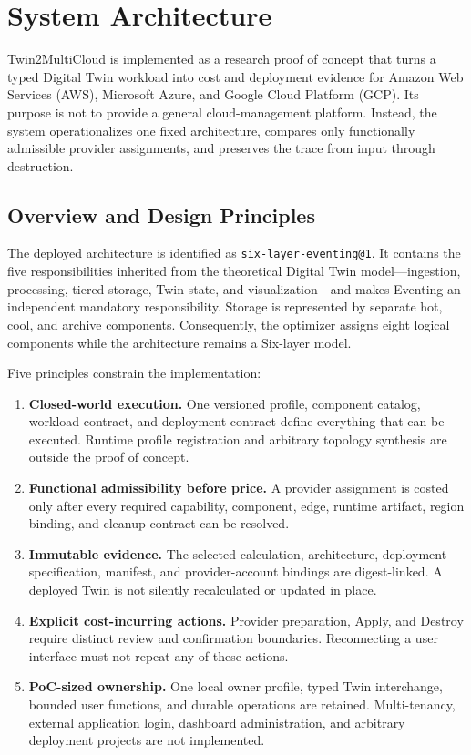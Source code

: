 \chapter{\label{chap:systemArchitecture}System Architecture}

Twin2MultiCloud is implemented as a research proof of concept that turns a
typed Digital Twin workload into cost and deployment evidence for Amazon Web
Services (AWS), Microsoft Azure, and Google Cloud Platform (GCP). Its purpose
is not to provide a general cloud-management platform. Instead, the system
operationalizes one fixed architecture, compares only functionally admissible
provider assignments, and preserves the trace from input through destruction.

\section{Overview and Design Principles}
\label{sec:arch-overview}

The deployed architecture is identified as
\texttt{six-layer-eventing@1}. It contains the five responsibilities inherited
from the theoretical Digital Twin model---ingestion, processing, tiered
storage, Twin state, and visualization---and makes Eventing an independent
mandatory responsibility. Storage is represented by separate hot, cool, and
archive components. Consequently, the optimizer assigns eight logical
components while the architecture remains a Six-layer model.

Five principles constrain the implementation:

\begin{enumerate}
    \item \textbf{Closed-world execution.} One versioned profile, component
    catalog, workload contract, and deployment contract define everything that
    can be executed. Runtime profile registration and arbitrary topology
    synthesis are outside the proof of concept.
    \item \textbf{Functional admissibility before price.} A provider
    assignment is costed only after every required capability, component,
    edge, runtime artifact, region binding, and cleanup contract can be
    resolved.
    \item \textbf{Immutable evidence.} The selected calculation, architecture,
    deployment specification, manifest, and provider-account bindings are
    digest-linked. A deployed Twin is not silently recalculated or updated in
    place.
    \item \textbf{Explicit cost-incurring actions.} Provider preparation,
    Apply, and Destroy require distinct review and confirmation boundaries.
    Reconnecting a user interface must not repeat any of these actions.
    \item \textbf{PoC-sized ownership.} One local owner profile, typed Twin
    interchange, bounded user functions, and durable operations are retained.
    Multi-tenancy, external application login, dashboard administration, and
    arbitrary deployment projects are not implemented.
\end{enumerate}

